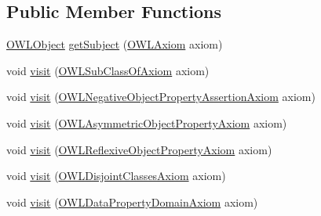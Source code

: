\subsection*{Public Member Functions}
\begin{DoxyCompactItemize}
\item 
\hyperlink{interfaceorg_1_1semanticweb_1_1owlapi_1_1model_1_1_o_w_l_object}{O\-W\-L\-Object} \hyperlink{classorg_1_1semanticweb_1_1owlapi_1_1util_1_1_axiom_subject_provider_a2b2c04601c7c8bdfff1152969a637f67}{get\-Subject} (\hyperlink{interfaceorg_1_1semanticweb_1_1owlapi_1_1model_1_1_o_w_l_axiom}{O\-W\-L\-Axiom} axiom)
\item 
void \hyperlink{classorg_1_1semanticweb_1_1owlapi_1_1util_1_1_axiom_subject_provider_aa7f04fd483ba28212e1dbaf2b54cc4c6}{visit} (\hyperlink{interfaceorg_1_1semanticweb_1_1owlapi_1_1model_1_1_o_w_l_sub_class_of_axiom}{O\-W\-L\-Sub\-Class\-Of\-Axiom} axiom)
\item 
void \hyperlink{classorg_1_1semanticweb_1_1owlapi_1_1util_1_1_axiom_subject_provider_a5f7d5fa335d34db8bf6ebe20a9ac746f}{visit} (\hyperlink{interfaceorg_1_1semanticweb_1_1owlapi_1_1model_1_1_o_w_l_negative_object_property_assertion_axiom}{O\-W\-L\-Negative\-Object\-Property\-Assertion\-Axiom} axiom)
\item 
void \hyperlink{classorg_1_1semanticweb_1_1owlapi_1_1util_1_1_axiom_subject_provider_a2e85137620059f54baf012b8d92b12ac}{visit} (\hyperlink{interfaceorg_1_1semanticweb_1_1owlapi_1_1model_1_1_o_w_l_asymmetric_object_property_axiom}{O\-W\-L\-Asymmetric\-Object\-Property\-Axiom} axiom)
\item 
void \hyperlink{classorg_1_1semanticweb_1_1owlapi_1_1util_1_1_axiom_subject_provider_ad44de7bf64b3796cba37d9529ffbd607}{visit} (\hyperlink{interfaceorg_1_1semanticweb_1_1owlapi_1_1model_1_1_o_w_l_reflexive_object_property_axiom}{O\-W\-L\-Reflexive\-Object\-Property\-Axiom} axiom)
\item 
void \hyperlink{classorg_1_1semanticweb_1_1owlapi_1_1util_1_1_axiom_subject_provider_a07495494d5835b0a2f56b6193440bdd1}{visit} (\hyperlink{interfaceorg_1_1semanticweb_1_1owlapi_1_1model_1_1_o_w_l_disjoint_classes_axiom}{O\-W\-L\-Disjoint\-Classes\-Axiom} axiom)
\item 
void \hyperlink{classorg_1_1semanticweb_1_1owlapi_1_1util_1_1_axiom_subject_provider_a327ef9cad9f306ee766d7f0e51d12af1}{visit} (\hyperlink{interfaceorg_1_1semanticweb_1_1owlapi_1_1model_1_1_o_w_l_data_property_domain_axiom}{O\-W\-L\-Data\-Property\-Domain\-Axiom} axiom)
\item 

\end{DoxyCompactItemize}
